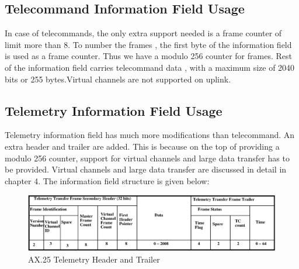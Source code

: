 \documentclass[BTech]{iitmdiss}
\begin{document}
\subsection{Telecommand Information Field Usage }

In case of telecommands, the only extra support needed is a frame counter of limit more than 8. To number the frames , the first byte of the information field is used as a  frame counter. Thus we have a modulo 256 counter for frames. Rest of the information field carries telecommand data , with a maximum size of 2040 bits or 255 bytes.Virtual channels are not supported on uplink.

\subsection{Telemetry Information Field Usage }
Telemetry information field has much more modifications than telecommand. An extra header and trailer are added. This is because on the top of providing a modulo 256 counter, support for virtual channels and large data transfer has to be provided. Virtual channels and large data transfer are discussed in detail in chapter 4.  The information field structure is given below: 
\newline
\begin{figure}[H]
\includegraphics[scale = 0.5]{ax25telemetry.eps}
\caption{AX.25 Telemetry Header and Trailer }
\label{fig:ax25telemetry}
\end{figure}
\end{document}
